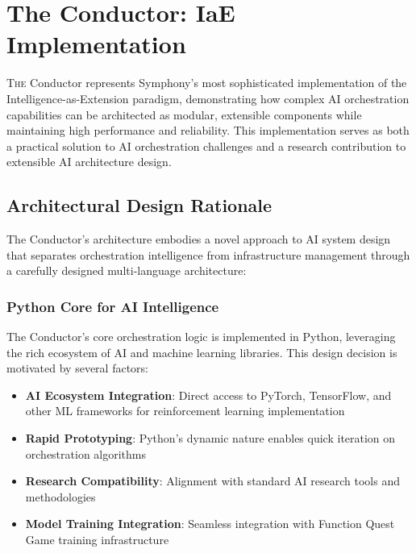 
\section{The Conductor: IaE Implementation}
\label{sec:conductor-iae}

\lettrine{T}{he} Conductor represents Symphony's most sophisticated implementation of the Intelligence-as-Extension paradigm, demonstrating how complex AI orchestration capabilities can be architected as modular, extensible components while maintaining high performance and reliability. This implementation serves as both a practical solution to AI orchestration challenges and a research contribution to extensible AI architecture design.

\subsection{Architectural Design Rationale}

The Conductor's architecture embodies a novel approach to AI system design that separates orchestration intelligence from infrastructure management through a carefully designed multi-language architecture:

\subsubsection{Python Core for AI Intelligence}

The Conductor's core orchestration logic is implemented in Python, leveraging the rich ecosystem of AI and machine learning libraries. This design decision is motivated by several factors:

\begin{itemize}
    \item \textbf{AI Ecosystem Integration}: Direct access to PyTorch, TensorFlow, and other ML frameworks for reinforcement learning implementation
    \item \textbf{Rapid Prototyping}: Python's dynamic nature enables quick iteration on orchestration algorithms
    \item \textbf{Research Compatibility}: Alignment with standard AI research tools and methodologies
    \item \textbf{Model Training Integration}: Seamless integration with Function Quest Game training infrastructure
\end{itemize}

